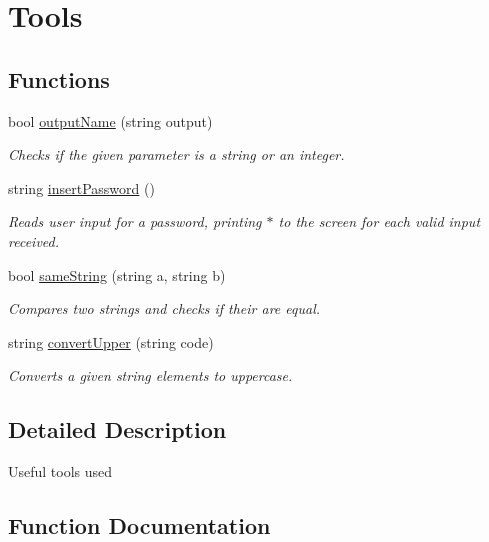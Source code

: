\hypertarget{group___tools}{}\section{Tools}
\label{group___tools}
\subsection*{Functions}
\begin{DoxyCompactItemize}
\item 
bool \hyperlink{group___tools_gaad651b6c4e56b86cbd2ffb7821be0a54}{output\+Name} (string output)
\begin{DoxyCompactList}\small\item\em Checks if the given parameter is a string or an integer. \end{DoxyCompactList}\item 
string \hyperlink{group___tools_gab80b2540006f8f151c4a48d31dfa7820}{insert\+Password} ()
\begin{DoxyCompactList}\small\item\em Reads user input for a password, printing \textquotesingle{}$\ast$\textquotesingle{} to the screen for each valid input received. \end{DoxyCompactList}\item 
bool \hyperlink{group___tools_ga0eaf893dd0f428f5f7b2e611c32c5ac5}{same\+String} (string a, string b)
\begin{DoxyCompactList}\small\item\em Compares two strings and checks if their are equal. \end{DoxyCompactList}\item 
string \hyperlink{group___tools_ga42d49458b6886497d814c129b650826c}{convert\+Upper} (string code)
\begin{DoxyCompactList}\small\item\em Converts a given string elements to uppercase. \end{DoxyCompactList}\end{DoxyCompactItemize}


\subsection{Detailed Description}
Useful tools used 

\subsection{Function Documentation}
\mbox{\label{group___tools_ga42d49458b6886497d814c129b650826c}} 
